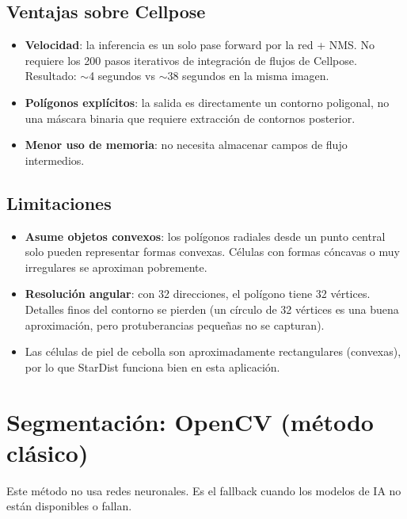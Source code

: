 \documentclass[11pt,a4paper]{article}
\begin{document}
\subsection{Ventajas sobre Cellpose}

\begin{itemize}
  \item \textbf{Velocidad}: la inferencia es un solo pase forward por la red + NMS. No requiere los 200 pasos iterativos de integraci\'{o}n de flujos de Cellpose. Resultado: $\sim$4 segundos vs $\sim$38 segundos en la misma imagen.
  \item \textbf{Pol\'{i}gonos expl\'{i}citos}: la salida es directamente un contorno poligonal, no una m\'{a}scara binaria que requiere extracci\'{o}n de contornos posterior.
  \item \textbf{Menor uso de memoria}: no necesita almacenar campos de flujo intermedios.
\end{itemize}

\subsection{Limitaciones}

\begin{itemize}
  \item \textbf{Asume objetos convexos}: los pol\'{i}gonos radiales desde un punto central solo pueden representar formas convexas. C\'{e}lulas con formas c\'{o}ncavas o muy irregulares se aproximan pobremente.
  \item \textbf{Resoluci\'{o}n angular}: con 32 direcciones, el pol\'{i}gono tiene 32 v\'{e}rtices. Detalles finos del contorno se pierden (un c\'{i}rculo de 32 v\'{e}rtices es una buena aproximaci\'{o}n, pero protuberancias peque\~{n}as no se capturan).
  \item Las c\'{e}lulas de piel de cebolla son aproximadamente rectangulares (convexas), por lo que StarDist funciona bien en esta aplicaci\'{o}n.
\end{itemize}

\section{Segmentaci\'{o}n: OpenCV (m\'{e}todo cl\'{a}sico)}
\label{sec:opencv}

Este m\'{e}todo no usa redes neuronales. Es el fallback cuando los modelos de IA no est\'{a}n disponibles o fallan.
\end{document}

